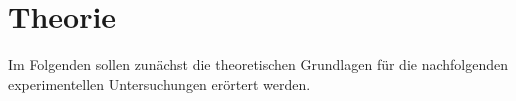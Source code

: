 \section{Theorie}
	
	Im Folgenden sollen zunächst die theoretischen Grundlagen für die nachfolgenden experimentellen Untersuchungen erörtert werden.
	

